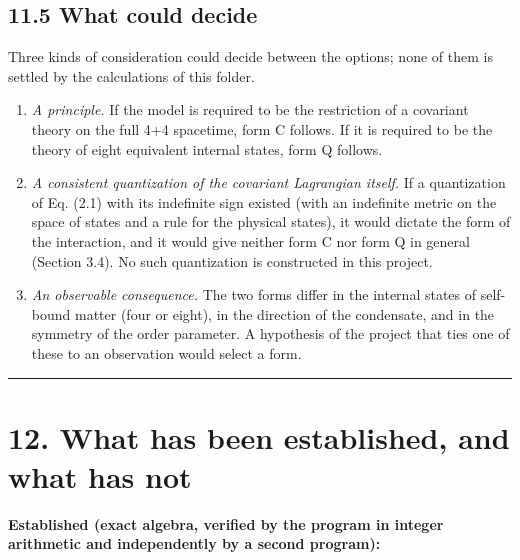 \documentclass[
  10pt,
]{article}
\providecommand{\tightlist}{%
  \setlength{\itemsep}{0pt}\setlength{\parskip}{0pt}}
\begin{document}
\hypertarget{what-could-decide}{%
\subsection{11.5 What could decide}\label{what-could-decide}}

Three kinds of consideration could decide between the options; none of
them is settled by the calculations of this folder.

\begin{enumerate}
\def\labelenumi{\arabic{enumi}.}
\tightlist
\item
  \emph{A principle.} If the model is required to be the restriction of
  a covariant theory on the full 4+4 spacetime, form C follows. If it is
  required to be the theory of eight equivalent internal states, form Q
  follows.
\item
  \emph{A consistent quantization of the covariant Lagrangian itself.}
  If a quantization of Eq. (2.1) with its indefinite sign existed (with
  an indefinite metric on the space of states and a rule for the
  physical states), it would dictate the form of the interaction, and it
  would give neither form C nor form Q in general (Section 3.4). No such
  quantization is constructed in this project.
\item
  \emph{An observable consequence.} The two forms differ in the internal
  states of self-bound matter (four or eight), in the direction of the
  condensate, and in the symmetry of the order parameter. A hypothesis
  of the project that ties one of these to an observation would select a
  form.
\end{enumerate}

\begin{center}\rule{0.5\linewidth}{0.5pt}\end{center}

\hypertarget{what-has-been-established-and-what-has-not}{%
\section{12. What has been established, and what has
not}\label{what-has-been-established-and-what-has-not}}

\textbf{Established (exact algebra, verified by the program in integer
arithmetic and independently by a second program):}
\end{document}
